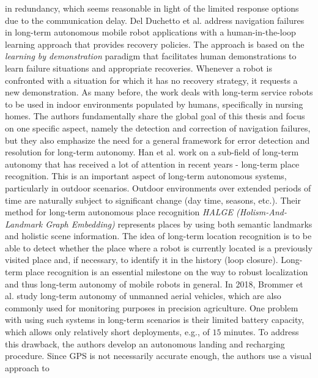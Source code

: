 \documentclass[english, master, utf8]{base/thesis_KBS}
\begin{document}
in redundancy, which seems reasonable in light of the limited response options due to the communication delay.\newline
Del Duchetto et al. \cite{DelDuchetto:2018} address navigation failures in long-term autonomous mobile robot applications with a human-in-the-loop learning approach that provides
recovery policies. The approach is based on the \textit{learning by demonstration} paradigm that facilitates human demonstrations to learn failure situations and appropriate recoveries.
Whenever a robot is confronted with a situation for which it has no recovery strategy, it requests a new demonstration. As many before, the work deals with long-term service robots to be used
in indoor environments populated by humans, specifically in nursing homes. The authors fundamentally share the global goal of this thesis and focus on one specific aspect, namely the
detection and correction of navigation failures, but they also emphasize the need for a general framework for error detection and resolution for long-term autonomy.\newline
Han et al. \cite{Han:2018} work on a sub-field of long-term autonomy that has received a lot of attention in recent years - long-term place recognition. This is an important aspect
of long-term autonomous systems, particularly in outdoor scenarios. Outdoor environments over extended periods of time are naturally subject to significant change (day time,
seasons, etc.). \cite{Han:2018} Their method for long-term autonomous place recognition \textit{HALGE (Holism-And-Landmark Graph Embedding)} represents places by using both semantic
landmarks and holistic scene information. The idea of long-term location recognition is to be able to detect whether the place where a robot is currently located is a
previously visited place and, if necessary, to identify it in the history (loop closure). \cite{Han:2018} Long-term place recognition is an essential milestone on the way to robust
localization and thus long-term autonomy of mobile robots in general.\newline
In 2018, Brommer et al. \cite{Brommer:2018} study long-term autonomy of unmanned aerial vehicles, which are also commonly used for monitoring purposes in precision agriculture. One problem with using such
systems in long-term scenarios is their limited battery capacity, which allows only relatively short deployments, e.g., of $15$ minutes. \cite{Brommer:2018}
To address this drawback, the authors develop an autonomous landing and recharging procedure. Since GPS is not necessarily accurate enough, the authors use a visual approach to
\end{document}
